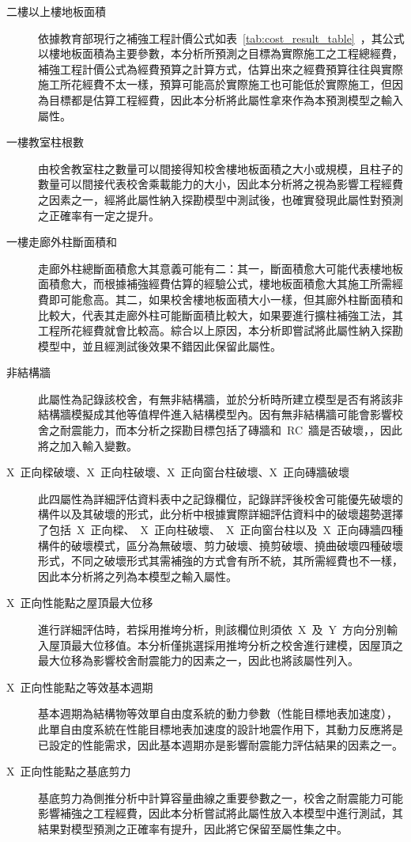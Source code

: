 \begin{description}
  \item[二樓以上樓地板面積]
  依據教育部現行之補強工程計價公式如表~\ref{tab:cost_result_table}~，其公式以樓地板面積為主要參數，本分析所預測之目標為實際施工之工程總經費，補強工程計價公式為經費預算之計算方式，估算出來之經費預算往往與實際施工所花經費不太一樣，預算可能高於實際施工也可能低於實際施工，但因為目標都是估算工程經費，因此本分析將此屬性拿來作為本預測模型之輸入屬性。
  \item[一樓教室柱根數]
  由校舍教室柱之數量可以間接得知校舍樓地板面積之大小或規模，且柱子的數量可以間接代表校舍乘載能力的大小，因此本分析將之視為影響工程經費之因素之一，經將此屬性納入探勘模型中測試後，也確實發現此屬性對預測之正確率有一定之提升。
  \item[一樓走廊外柱斷面積和]
  走廊外柱總斷面積愈大其意義可能有二：其一，斷面積愈大可能代表樓地板面積愈大，而根據補強經費估算的經驗公式，樓地板面積愈大其施工所需經費即可能愈高。其二，如果校舍樓地板面積大小一樣，但其廊外柱斷面積和比較大，代表其走廊外柱可能斷面積比較大，如果要進行擴柱補強工法，其工程所花經費就會比較高。綜合以上原因，本分析即嘗試將此屬性納入探勘模型中，並且經測試後效果不錯因此保留此屬性。
  \item[非結構牆]
  此屬性為記錄該校舍，有無非結構牆，並於分析時所建立模型是否有將該非結構牆模擬成其他等值桿件進入結構模型內。因有無非結構牆可能會影響校舍之耐震能力，而本分析之探勘目標包括了磚牆和~RC~牆是否破壞，，因此將之加入輸入變數。
  \item[X~正向樑破壞、X~正向柱破壞、X~正向窗台柱破壞、X~正向磚牆破壞]
  此四屬性為詳細評估資料表中之記錄欄位，記錄詳評後校舍可能優先破壞的構件以及其破壞的形式，此分析中根據實際詳細評估資料中的破壞趨勢選擇了包括~X~正向樑、~X~正向柱破壞、~X~正向窗台柱以及~X~正向磚牆四種構件的破壞模式，區分為無破壞、剪力破壞、撓剪破壞、撓曲破壞四種破壞形式，不同之破壞形式其需補強的方式會有所不統，其所需經費也不一樣，因此本分析將之列為本模型之輸入屬性。
  \item[X~正向性能點之屋頂最大位移]
  \cite{ncree08035}進行詳細評估時，若採用推垮分析，則該欄位則須依~X~及~Y~方向分別輸入屋頂最大位移值。本分析僅挑選採用推垮分析之校舍進行建模，因屋頂之最大位移為影響校舍耐震能力的因素之一，因此也將該屬性列入。
  \item[X~正向性能點之等效基本週期]
  \cite{ncree09015}基本週期為結構物等效單自由度系統的動力參數（性能目標地表加速度），此單自由度系統在性能目標地表加速度的設計地震作用下，其動力反應將是已設定的性能需求，因此基本週期亦是影響耐震能力評估結果的因素之一。
  \item[X~正向性能點之基底剪力]
  基底剪力為側推分析中計算容量曲線之重要參數之一，校舍之耐震能力可能影響補強之工程經費，因此本分析嘗試將此屬性放入本模型中進行測試，其結果對模型預測之正確率有提升，因此將它保留至屬性集之中。

\end{description}
